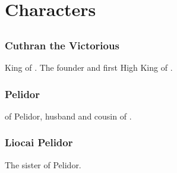
\part[Scatha Characters]{\Scatha Characters}
\chapter{\Velcadians}















\section{Cuthran the Victorious}
King of \Vidra. 
The founder and first High King of . 















\section{\Icor Pelidor}
\Rayuth of Pelidor, husband and cousin of . 















\section{Liocai Pelidor}
The sister of \Icor{} Pelidor. 









